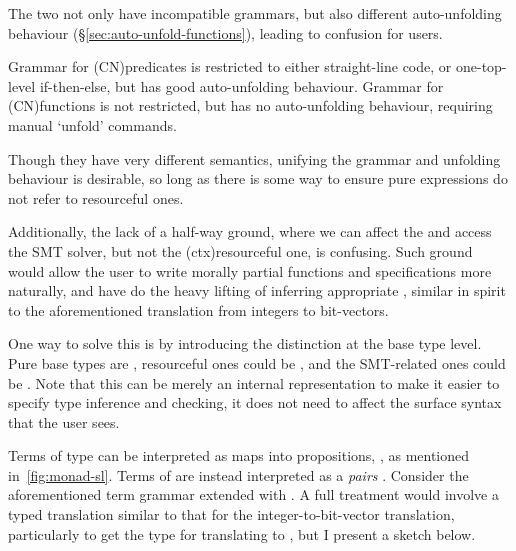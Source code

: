 The two not only have incompatible grammars, but also different auto-unfolding
behaviour (\S\ref{sec:auto-unfold-functions}), leading to confusion for
users.

Grammar for \kl(CN){predicates} is restricted to either straight-line code, or
one-top-level if-then-else, but has good auto-unfolding behaviour. Grammar for
\kl(CN){functions} is not restricted, but has no auto-unfolding behaviour,
requiring manual `unfold' commands.

Though they have very different semantics, unifying the grammar and unfolding
behaviour is desirable, so long as there is some way to ensure pure expressions
do not refer to resourceful ones.

Additionally, the lack of a half-way ground, where we can affect the
 and access the SMT solver, but not the
\kl(ctx){resourceful} one, is confusing. Such ground would allow the user to
write morally partial functions and specifications more naturally, and have
 do the heavy lifting of inferring appropriate ,
similar in spirit to the aforementioned translation from integers to
bit-vectors.

One way to solve this is by introducing the distinction at the base type level.
Pure base types are \sm{\beta}, resourceful ones could be
, and the SMT-related ones could be
. Note that this can be merely an internal
representation to make it easier to specify type inference and checking, it
does not need to affect the surface syntax that the user sees.

Terms of type  can be interpreted as maps into  propositions, , as mentioned
in~\cref{fig:monad-sl}. Terms of  are instead interpreted as
a \emph{pairs} . Consider the
aforementioned term grammar extended with . A full treatment
would involve a typed translation similar to that for the integer-to-bit-vector
translation, particularly to get the type \sm{\beta} for translating
 to , but I present a sketch below.

